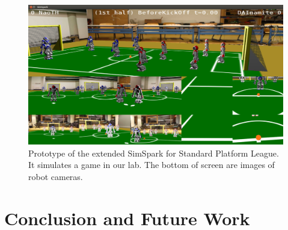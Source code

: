 \documentclass{llncs}
\begin{document}
\begin{figure}
  \centering
  \includegraphics[width = 0.95\columnwidth]{simspark-spl}
  \caption{Prototype of the extended SimSpark for Standard Platform League.
    It simulates a game in our lab. The bottom of screen are images of robot cameras.}
  \label{f:nao-models}
\end{figure}

\section{Conclusion and Future Work}



\end{document}
